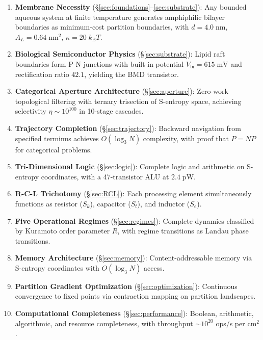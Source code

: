 \documentclass[twocolumn,10pt]{article}
\theoremstyle{remark}
\newcommand{\kB}{k_{\mathrm{B}}}
\newcommand{\Sk}{S_k}
\newcommand{\St}{S_t}
\newcommand{\Se}{S_e}
\begin{document}
\begin{enumerate}
\item \textbf{Membrane Necessity} (\S\ref{sec:foundations}--\ref{sec:substrate}): Any bounded aqueous system at finite temperature generates amphiphilic bilayer boundaries as minimum-cost partition boundaries, with $d = 4.0\;\mathrm{nm}$, $A_L = 0.64\;\mathrm{nm}^2$, $\kappa = 20\;\kB T$.

\item \textbf{Biological Semiconductor Physics} (\S\ref{sec:substrate}): Lipid raft boundaries form P-N junctions with built-in potential $V_{\mathrm{bi}} = 615\;\mathrm{mV}$ and rectification ratio $42.1$, yielding the BMD transistor.

\item \textbf{Categorical Aperture Architecture} (\S\ref{sec:aperture}): Zero-work topological filtering with ternary trisection of S-entropy space, achieving selectivity $\eta \sim 10^{100}$ in 10-stage cascades.

\item \textbf{Trajectory Completion} (\S\ref{sec:trajectory}): Backward navigation from specified terminus achieves $O(\log_3 N)$ complexity, with proof that $P = NP$ for categorical problems.

\item \textbf{Tri-Dimensional Logic} (\S\ref{sec:logic}): Complete logic and arithmetic on S-entropy coordinates, with a 47-transistor ALU at $2.4\;\mathrm{pW}$.

\item \textbf{R-C-L Trichotomy} (\S\ref{sec:RCL}): Each processing element simultaneously functions as resistor ($\Sk$), capacitor ($\St$), and inductor ($\Se$).

\item \textbf{Five Operational Regimes} (\S\ref{sec:regimes}): Complete dynamics classified by Kuramoto order parameter $R$, with regime transitions as Landau phase transitions.

\item \textbf{Memory Architecture} (\S\ref{sec:memory}): Content-addressable memory via S-entropy coordinates with $O(\log_3 N)$ access.

\item \textbf{Partition Gradient Optimization} (\S\ref{sec:optimization}): Continuous convergence to fixed points via contraction mapping on partition landscapes.

\item \textbf{Computational Completeness} (\S\ref{sec:performance}): Boolean, arithmetic, algorithmic, and resource completeness, with throughput $\sim 10^{20}$ ops/s per $\mathrm{cm}^2$.
\end{enumerate}
\end{document}

